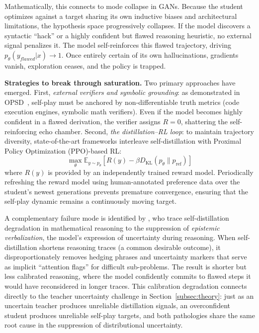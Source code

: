 \documentclass{article} %
\newcommand{\KL}{D_{\mathrm{KL}}}
\newcommand{\ptheta}{p_\theta}
\begin{document}
Mathematically, this connects to mode collapse in GANs. Because the student optimizes against a target sharing its own inductive biases and architectural limitations, the hypothesis space progressively collapses. If the model discovers a syntactic ``hack'' or a highly confident but flawed reasoning heuristic, no external signal penalizes it. The model self-reinforces this flawed trajectory, driving $\ptheta(y_{flawed}|x) \to 1$. Once entirely certain of its own hallucinations, gradients vanish, exploration ceases, and the policy is trapped.

\textbf{Strategies to break through saturation.}
Two primary approaches have emerged. First, \emph{external verifiers and symbolic grounding}: as demonstrated in OPSD~\citep{2601.18734}, self-play must be anchored by non-differentiable truth metrics (code execution engines, symbolic math verifiers). Even if the model becomes highly confident in a flawed derivation, the verifier assigns $R=0$, shattering the self-reinforcing echo chamber. Second, \emph{the distillation--RL loop}: to maintain trajectory diversity, state-of-the-art frameworks interleave self-distillation with Proximal Policy Optimization (PPO)-based RL:
\begin{equation}
    \max_\theta \mathbb{E}_{y \sim \ptheta} \left[ R(y) - \beta \KL(\ptheta \parallel p_{\mathrm{ref}}) \right]
\end{equation}
where $R(y)$ is provided by an independently trained reward model. Periodically refreshing the reward model using human-annotated preference data over the student's newest generations prevents premature convergence, ensuring that the self-play dynamic remains a continuously moving target.

A complementary failure mode is identified by \citet{2603.24472}, who trace self-distillation degradation in mathematical reasoning to the suppression of \emph{epistemic verbalization}, the model's expression of uncertainty during reasoning. When self-distillation shortens reasoning traces (a common desirable outcome), it disproportionately removes hedging phrases and uncertainty markers that serve as implicit ``attention flags'' for difficult sub-problems. The result is shorter but less calibrated reasoning, where the model confidently commits to flawed steps it would have reconsidered in longer traces. This calibration degradation connects directly to the teacher uncertainty challenge in Section~\ref{subsec:theory}: just as an uncertain teacher produces unreliable distillation signals, an overconfident student produces unreliable self-play targets, and both pathologies share the same root cause in the suppression of distributional uncertainty.
\end{document}
